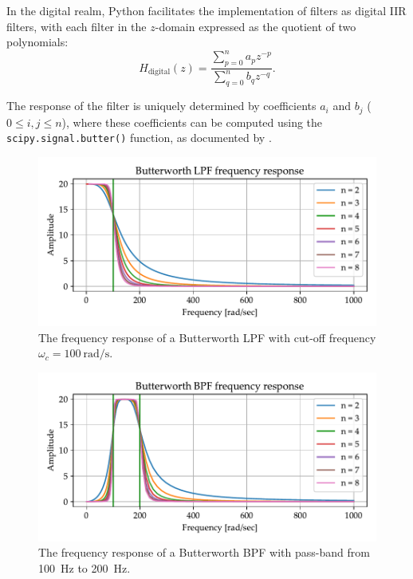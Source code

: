 \documentclass[../ECE459FinalProjectReport.tex]{subfiles}
\begin{document}
In the digital realm, Python facilitates the implementation of filters as digital IIR filters, with each filter in the $z$-domain expressed as the quotient of two polynomials:
\begin{equation}
    H_{\text{digital}}(z) = \frac{\sum_{p=0}^{n}{a_pz^{-p}}}{\sum_{q=0}^{n}{b_qz^{-q}}}.
\end{equation}

The response of the filter is uniquely determined by coefficients $a_i$ and $b_j$ ($0 \leq i, j \leq n$), where these coefficients can be computed using the \verb|scipy.signal.butter()| function, as documented by \cite{thescipycommunityScipySignalButter, thescipycommunityScipySignalFiltfilt, thescipycommunityScipySignalLfilter}.

\begin{figure}[tb]
    \centering
    \includegraphics[scale=.6]{plots/butterworth-lpf-nolog.pdf}
    \caption{The frequency response of a Butterworth LPF with cut-off frequency $\omega_c = \SI{100}{\radian\per\s}$.}
    \label{fig:butter-lpf}
\end{figure}
\begin{figure}[tb]
    \centering
    \includegraphics[scale=.6]{plots/butterworth-bpf-nolog.pdf}
    \caption{The frequency response of a Butterworth BPF with pass-band from \SI{100}{Hz} to \SI{200}{Hz}.}
    \label{fig:butter-bpf}
\end{figure}
\end{document}

